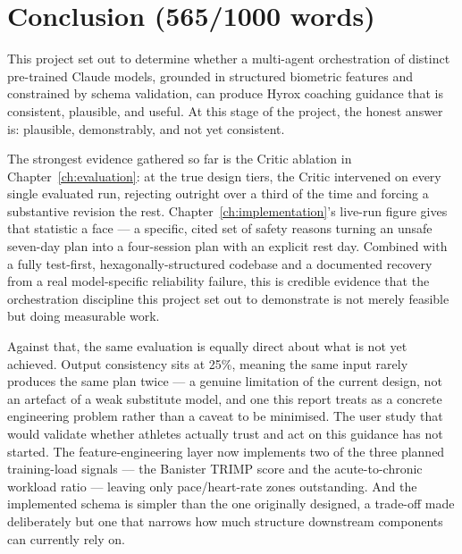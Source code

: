 
\chapter{Conclusion (565/1000 words)}
\label{ch:conclusion}

This project set out to determine whether a multi-agent orchestration of distinct pre-trained Claude models, grounded in structured biometric features and constrained by schema validation, can produce Hyrox coaching guidance that is consistent, plausible, and useful. At this stage of the project, the honest answer is: plausible, demonstrably, and not yet consistent.

The strongest evidence gathered so far is the Critic ablation in Chapter~\ref{ch:evaluation}: at the true design tiers, the Critic intervened on every single evaluated run, rejecting outright over a third of the time and forcing a substantive revision the rest. Chapter~\ref{ch:implementation}'s live-run figure gives that statistic a face --- a specific, cited set of safety reasons turning an unsafe seven-day plan into a four-session plan with an explicit rest day. Combined with a fully test-first, hexagonally-structured codebase and a documented recovery from a real model-specific reliability failure, this is credible evidence that the orchestration discipline this project set out to demonstrate is not merely feasible but doing measurable work.

Against that, the same evaluation is equally direct about what is not yet achieved. Output consistency sits at 25\%, meaning the same input rarely produces the same plan twice --- a genuine limitation of the current design, not an artefact of a weak substitute model, and one this report treats as a concrete engineering problem rather than a caveat to be minimised. The user study that would validate whether athletes actually trust and act on this guidance has not started. The feature-engineering layer now implements two of the three planned training-load signals --- the Banister TRIMP score and the acute-to-chronic workload ratio --- leaving only pace/heart-rate zones outstanding. And the implemented schema is simpler than the one originally designed, a trade-off made deliberately but one that narrows how much structure downstream components can currently rely on.

